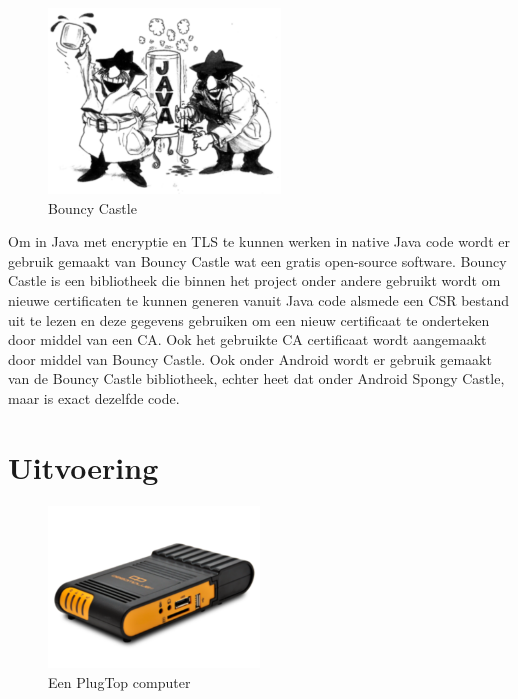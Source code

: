\documentclass[]{article}
\begin{document}
\begin{figure}
  \begin{center}
    \includegraphics[width=0.55\textwidth]{bouncyjava.pdf}
  \end{center}
  \caption{Bouncy Castle}
\end{figure}
Om in Java met encryptie en TLS te kunnen werken in native Java code wordt
er gebruik gemaakt van Bouncy Castle wat een gratis open-source software.
Bouncy Castle is een bibliotheek die binnen het project onder andere
gebruikt wordt om nieuwe certificaten te kunnen generen vanuit Java code
alsmede een CSR bestand uit te lezen en deze gegevens gebruiken om een
nieuw certificaat te onderteken door middel van een CA. Ook het gebruikte
CA certificaat wordt aangemaakt door middel van Bouncy Castle. Ook onder 
Android wordt er gebruik gemaakt van de Bouncy Castle bibliotheek, echter 
heet dat onder Android Spongy Castle, maar is exact dezelfde code.

\newpage
\section{Uitvoering}

\begin{figure}
  \begin{center}
    \includegraphics[width=0.50\textwidth]{dreamplug.pdf}
  \end{center}
  \caption{Een PlugTop computer}
\end{figure}
\end{document}
